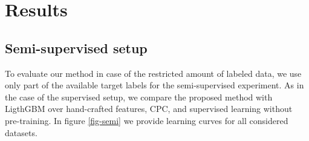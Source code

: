 \documentclass{article}
\begin{document}
\section{Results} \label{sec-res}

\subsection{Semi-supervised setup}

To evaluate our method in case of the restricted amount of labeled data, we use only part of the available target labels for the semi-supervised experiment. As in the case of the supervised setup, we compare the proposed method with LigthGBM over hand-crafted features, CPC, and supervised learning without pre-training. In figure \ref{fig-semi} we provide learning curves for all considered datasets.
\end{document}
